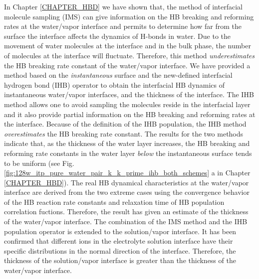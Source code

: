 In Chapter \ref{CHAPTER_HBD} we have shown that,
the method of interfacial molecule sampling (IMS) can give information on the HB breaking and reforming
rates at the water/vapor interface and permits to determine how far from the surface the interface affects the dynamics of H-bonds in water. 
Due to the movement of water molecules at the interface and in the bulk phase, the number of molecules at the interface will fluctuate.
Therefore, this method \emph{underestimates} the HB breaking rate constant of the water/vapor interface. 
We have provided a method based on the \emph{instantaneous} surface and the new-defined
interfacial hydrogen bond (IHB) operator to obtain the interfacial HB dynamics of instantaneous water/vapor interfaces, and the thickness of the interface.  
The IHB method allows one to avoid sampling the molecules reside in the interfacial layer and
it also provide partial information on the HB breaking and reforming rates at the interface. 
Because of the definition of the IHB population, the IHB method \emph{overestimates} the HB breaking rate constant. 
The results for the two methods indicate that,
as the thickness of the water layer increases,
the HB breaking and reforming rate constants in the water layer \emph{below} the instantaneous surface tends to be uniform 
(see Fig.\thinspace\ref{fig:128w_itp_pure_water_pair_k_k_prime_ihb_both_schemes} a in Chapter \ref{CHAPTER_HBD}). 
The real HB dynamical characteristics at the water/vapor interface 
are derived from the two extreme cases using the convergence behavior of the HB reaction rate constants and relaxation time 
of HB population correlation fuctions. 
Therefore, the result has given an estimate of the thickness of the water/vapor interface.  
The combination of the IMS method and the IHB population operator is extended to the solution/vapor interface. 
It has been confirmed that different ions in the electrolyte solution interface have their specific distributions in the normal direction of the interface. 
Therefore, the thickness of the solution/vapor interface is greater than the thickness of the water/vapor interface. 

